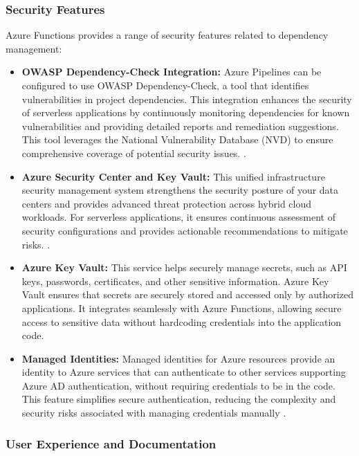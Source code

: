 \documentclass[sigconf]{acmart}
\begin{document}
\subsubsection{Security Features}

Azure Functions provides a range of security features related to dependency management:

\begin{itemize}
    \item \textbf{OWASP Dependency-Check Integration:} Azure Pipelines can be configured to use OWASP Dependency-Check, a tool that identifies vulnerabilities in project dependencies. This integration enhances the security of serverless applications by continuously monitoring dependencies for known vulnerabilities and providing detailed reports and remediation suggestions. This tool leverages the National Vulnerability Database (NVD) to ensure comprehensive coverage of potential security issues. \cite{azureowasp2023}.
    \item \textbf{Azure Security Center and Key Vault:} This unified infrastructure security management system strengthens the security posture of your data centers and provides advanced threat protection across hybrid cloud workloads. For serverless applications, it ensures continuous assessment of security configurations and provides actionable recommendations to mitigate risks. \cite{azureSecurity2023}.
    \item \textbf{Azure Key Vault:} This service helps securely manage secrets, such as API keys, passwords, certificates, and other sensitive information. Azure Key Vault ensures that secrets are securely stored and accessed only by authorized applications. It integrates seamlessly with Azure Functions, allowing secure access to sensitive data without hardcoding credentials into the application code.
    \item \textbf{Managed Identities:} Managed identities for Azure resources provide an identity to Azure services that can authenticate to other services supporting Azure AD authentication, without requiring credentials to be in the code. This feature simplifies secure authentication, reducing the complexity and security risks associated with managing credentials manually \cite{azureManagedIdentities2023}.
\end{itemize}

\subsubsection{User Experience and Documentation}
\end{document}
